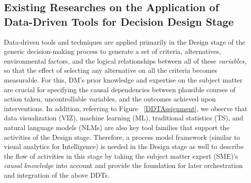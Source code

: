 \documentclass{sfuthesis}
\begin{document}
\subsection{Existing Researches on the Application of Data-Driven Tools for Decision Design Stage} \label{ExistingResearchDesign}
Data-driven tools and techniques are applied primarily in the Design stage of the generic decision-making process to generate a set of criteria, alternatives, environmental factors, and the logical relationships between all of these \textit{variables}, so that the effect of selecting any alternative on all the criteria becomes measurable. For this, DM’s prior knowledge and expertise on the subject matter are crucial for specifying the causal dependencies between plausible courses of action taken, uncontrollable variables, and the outcomes achieved upon interventions. In addition, referring to Figure ~\ref{DDTAssignment}, we observe that data visualization (VIZ), machine learning (ML), traditional statistics (TS), and natural language models (NLMs) are also key tool families that support the activities of the Design stage. Therefore, a process model framework (similar to visual analytics for Intelligence) is needed in the Design stage as well to describe the flow of activities in this stage by taking the subject matter expert (SME)'s \textit{causal knowledge} into account and provide the foundation for later orchestration and integration of the above DDTs.
\end{document}
